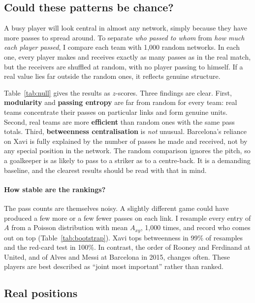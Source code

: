 \documentclass[11pt,a4paper]{article}
\begin{document}


\subsection{Could these patterns be chance?}\label{sec:significance}

A busy player will look central in almost any network, simply because they have more passes to spread around. To separate \emph{who passed to whom} from \emph{how much each player passed}, I compare each team with 1{,}000 random networks. In each one, every player makes and receives exactly as many passes as in the real match, but the receivers are shuffled at random, with no player passing to himself. If a real value lies far outside the random ones, it reflects genuine structure.

Table~\ref{tab:null} gives the results as $z$-scores. Three findings are clear. First, \textbf{modularity} and \textbf{passing entropy} are far from random for every team: real teams concentrate their passes on particular links and form genuine units. Second, real teams are more \textbf{efficient} than random ones with the same pass totals. Third, \textbf{betweenness centralisation} is \emph{not} unusual. Barcelona's reliance on Xavi is fully explained by the number of passes he made and received, not by any special position in the network. The random comparison ignores the pitch, so a goalkeeper is as likely to pass to a striker as to a centre-back. It is a demanding baseline, and the clearest results should be read with that in mind.



\paragraph{How stable are the rankings?} The pass counts are themselves noisy. A slightly different game could have produced a few more or a few fewer passes on each link. I resample every entry of $A$ from a Poisson distribution with mean $A_{xy}$, 1{,}000 times, and record who comes out on top (Table~\ref{tab:bootstrap}). Xavi tops betweenness in 99\% of resamples and the red-card test in 100\%. In contrast, the order of Rooney and Ferdinand at United, and of Alves and Messi at Barcelona in 2015, changes often. These players are best described as ``joint most important'' rather than ranked.



\subsection{Real positions}\label{sec:positions}
\end{document}
